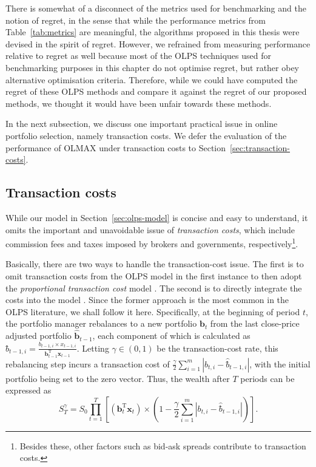 \begin{mccorrection}
There is somewhat of a disconnect of the metrics used for benchmarking and the notion of regret, in the sense that while the performance metrics from Table~\ref{tab:metrics} are meaningful, the algorithms proposed in this thesis were devised in the spirit of regret. However, we refrained from measuring performance relative to regret as well because most of the OLPS techniques used for benchmarking purposes in this chapter do not optimise regret, but rather obey alternative optimisation criteria. Therefore, while we could have computed the regret of these OLPS methods and compare it against the regret of our proposed methods, we thought it would have been unfair towards these methods.
\end{mccorrection}

In the next subsection, we discuss one important practical issue in online portfolio selection, namely transaction costs. We defer the evaluation of the performance of OLMAX under transaction costs to Section~\ref{sec:transaction-costs}.

\subsection{Transaction costs}

While our model in Section~\ref{sec:olps-model} is concise and easy to understand, it omits the important and unavoidable issue of \emph{transaction costs}, which include commission fees and taxes imposed by brokers and governments, respectively\footnote{Besides these, other factors such as bid-ask spreads contribute to transaction costs.}.

Basically, there are two ways to handle the transaction-cost issue. The first is to omit transaction costs from the OLPS model in the first instance to then adopt the \emph{proportional transaction cost} model \citep{blum99}. The second is to directly integrate the costs into the model \citep{gyorfi08}. Since the former approach is the most common in the OLPS literature, we shall follow it here. Specifically, at the beginning of period $t$, the portfolio manager rebalances to a new portfolio $\mathbf{b}_t$ from the last close-price adjusted portfolio $\widehat{\mathbf{b}}_{t-1}$, each component of which is calculated as $\widehat{b̂}_{t-1,i} = \frac{b_{t-1,i} \times x_{t-1,i}}{\mathbf{b}_{t-1}^\text{T}\mathbf{x}_{t-1}}$. Letting $\gamma \in (0, 1)$ be the transaction-cost rate, this rebalancing step incurs a transaction cost of $\frac{\gamma}{2}\sum_{i=1}^m |b_{t,i} - \widehat{b̂}_{t-1,i}|$, with the initial portfolio being set to the zero vector. Thus, the wealth after $T$ periods can be expressed as
\begin{equation}
	S_T^\gamma
	= S_0 \prod_{t=1}^T \left[(\mathbf{b}_t^\text{T}\mathbf{x}_t) \times \left(1 - \frac{\gamma}{2}\sum_{i=1}^m |b_{t,i} - \widehat{b̂}_{t-1,i}|\right)\right].
\end{equation}

